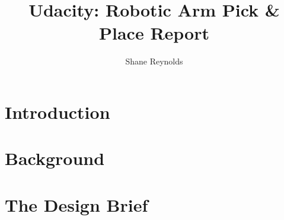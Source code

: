 \documentclass[a4paper]{article}
\begin{document}
\title{Udacity: Robotic Arm Pick \& Place Report}
\author{Shane Reynolds}
\maketitle
\section{Introduction}


\section{Background}


\section{The Design Brief}
\end{document}
